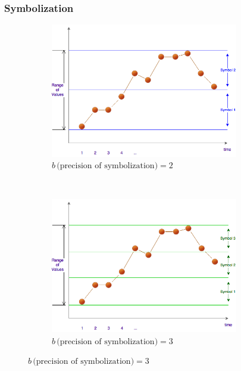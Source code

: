 \documentclass[10pt]{beamer}
\begin{document}
\begin{frame}[c]\frametitle{Symbolization}
    \begin{figure}[!ht] \centering
    	\caption*{ }
        \begin{subfigure}[b]{0.5\textwidth} \centering
            \includegraphics[width=0.9\textwidth]{figures/lamperti_2018_simb1.png}
            \caption{$b\, \text{(precision of symbolization)} =2$}
        \end{subfigure}%
        ~
        \begin{subfigure}[b]{0.5\textwidth} \centering
			\includegraphics[width=0.9\textwidth]{figures/lamperti_2018_simb2.png}
            \caption{$b\, \text{(precision of symbolization)} =3$}
        \end{subfigure}
	\end{figure}
\end{frame}
\end{document}
